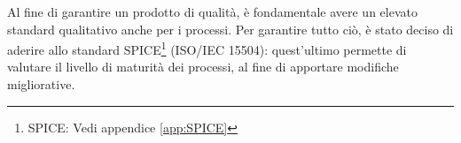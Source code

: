 Al fine di garantire un prodotto di qualità, è fondamentale avere un elevato standard qualitativo anche per i processi. Per garantire tutto ciò, è stato deciso di aderire allo standard {SPICE}\footnote{SPICE: Vedi appendice \cref{app:SPICE}} (ISO/IEC 15504): quest'ultimo permette di valutare il livello di maturità dei processi, al fine di apportare modifiche migliorative.
